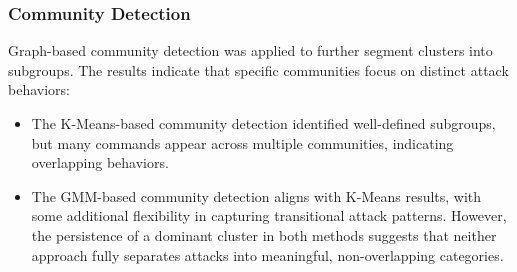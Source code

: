             \subsubsection{Community Detection \\}
            
                Graph-based community detection was applied to further segment clusters into subgroups. The results indicate that specific communities focus on distinct attack behaviors:

                \begin{itemize}
                    \item The K-Means-based community detection identified well-defined subgroups, but many commands appear across multiple communities, indicating overlapping behaviors.
                    \item The GMM-based community detection aligns with K-Means results, with some additional flexibility in capturing transitional attack patterns. However, the persistence of a dominant cluster in both methods suggests that neither approach fully separates attacks into meaningful, non-overlapping categories.
                \end{itemize}
                
